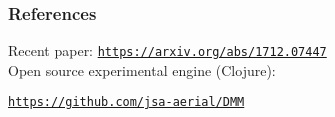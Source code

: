 \documentclass{beamer}
\begin{document}
\begin{frame}

  \frametitle{References}

Recent paper: \href{https://arxiv.org/abs/1712.07447}{\tt\footnotesize  https://arxiv.org/abs/1712.07447}\\[4ex]

Open source experimental engine (Clojure):

\href{https://github.com/jsa-aerial/DMM}{\tt\footnotesize https://github.com/jsa-aerial/DMM}


\end{frame}
\end{document}
